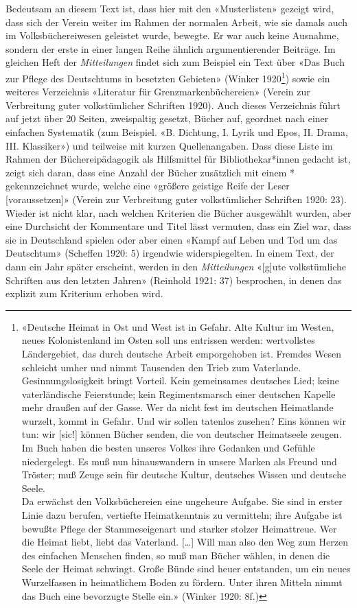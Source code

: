 \documentclass[a4paper,
fontsize=11pt,
oneside,
numbers=noperiodatend,
parskip=half-,
bibliography=totoc,
final
]{scrartcl}
\begin{document}
Bedeutsam an diesem Text ist, dass hier mit den «Musterlisten» gezeigt
wird, dass sich der Verein weiter im Rahmen der normalen Arbeit, wie sie
damals auch im Volksbüchereiwesen geleistet wurde, bewegte. Er war auch
keine Ausnahme, sondern der erste in einer langen Reihe ähnlich
argumentierender Beiträge. Im gleichen Heft der \emph{Mitteilungen}
findet sich zum Beispiel ein Text über «Das Buch zur Pflege des
Deutschtums in besetzten Gebieten» (Winker 1920\footnote{«Deutsche
  Heimat in Ost und West ist in Gefahr. Alte Kultur im Westen, neues
  Kolonistenland im Osten soll uns entrissen werden: wertvollstes
  Ländergebiet, das durch deutsche Arbeit emporgehoben ist. Fremdes
  Wesen schleicht umher und nimmt Tausenden den Trieb zum Vaterlande.
  Gesinnungslosigkeit bringt Vorteil. Kein gemeinsames deutsches Lied;
  keine vaterländische Feierstunde; kein Regimentsmarsch einer deutschen
  Kapelle mehr draußen auf der Gasse. Wer da nicht fest im deutschen
  Heimatlande wurzelt, kommt in Gefahr. Und wir sollen tatenlos zusehen?
  Eins können wir tun: wir {[}sic!{]} können Bücher senden, die von
  deutscher Heimatseele zeugen. Im Buch haben die besten unseres Volkes
  ihre Gedanken und Gefühle niedergelegt. Es muß nun hinauswandern in
  unsere Marken als Freund und Tröster; muß Zeuge sein für deutsche
  Kultur, deutsches Wissen und deutsche Seele.\\
  Da erwächst den Volksbüchereien eine ungeheure Aufgabe. Sie sind in
  erster Linie dazu berufen, vertiefte Heimatkenntnis zu vermitteln;
  ihre Aufgabe ist bewußte Pflege der Stammeseigenart und starker
  stolzer Heimattreue. Wer die Heimat liebt, liebt das Vaterland.
  {[}\ldots{]} Will man also den Weg zum Herzen des einfachen Menschen
  finden, so muß man Bücher wählen, in denen die Seele der Heimat
  schwingt. Große Bünde sind heuer entstanden, um ein neues Wurzelfassen
  in heimatlichem Boden zu fördern. Unter ihren Mitteln nimmt das Buch
  eine bevorzugte Stelle ein.» (Winker 1920: 8f.)}) sowie ein weiteres
Verzeichnis «Literatur für Grenzmarkenbüchereien» (Verein zur
Verbreitung guter volkstümlicher Schriften 1920). Auch dieses
Verzeichnis führt auf jetzt über 20 Seiten, zweispaltig gesetzt, Bücher
auf, geordnet nach einer einfachen Systematik (zum Beispiel. «B.
Dichtung, I. Lyrik und Epos, II. Drama, III. Klassiker») und teilweise
mit kurzen Quellenangaben. Dass diese Liste im Rahmen der
Büchereipädagogik als Hilfsmittel für Bibliothekar*innen gedacht ist,
zeigt sich daran, dass eine Anzahl der Bücher zusätzlich mit einem *
gekennzeichnet wurde, welche eine «größere geistige Reife der Leser
{[}voraussetzen{]}» (Verein zur Verbreitung guter volkstümlicher
Schriften 1920: 23). Wieder ist nicht klar, nach welchen Kriterien die
Bücher ausgewählt wurden, aber eine Durchsicht der Kommentare und Titel
lässt vermuten, dass ein Ziel war, dass sie in Deutschland spielen oder
aber einen «Kampf auf Leben und Tod um das Deutschtum» (Scheffen 1920:
5) irgendwie widerspiegelten. In einem Text, der dann ein Jahr später
erscheint, werden in den \emph{Mitteilungen} «{[}g{]}ute volkstümliche
Schriften aus den letzten Jahren» (Reinhold 1921: 37) besprochen, in
denen das explizit zum Kriterium erhoben wird.
\end{document}
